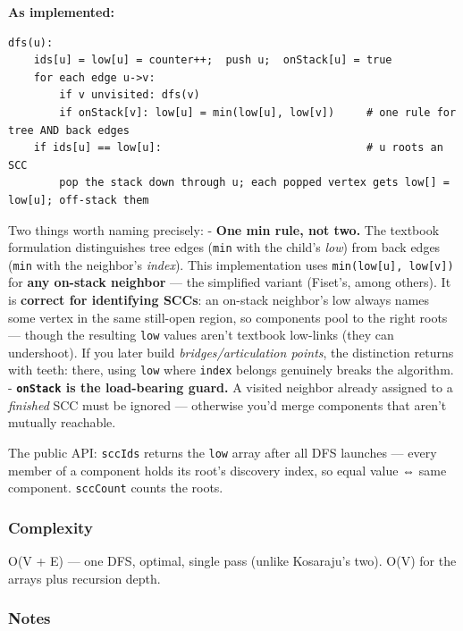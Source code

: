 \documentclass[
  10pt,
  letterpaper,
  onecolumn]{article}
\begin{document}
\textbf{As implemented:}

\begin{verbatim}
dfs(u):
    ids[u] = low[u] = counter++;  push u;  onStack[u] = true
    for each edge u->v:
        if v unvisited: dfs(v)
        if onStack[v]: low[u] = min(low[u], low[v])     # one rule for tree AND back edges
    if ids[u] == low[u]:                                # u roots an SCC
        pop the stack down through u; each popped vertex gets low[] = low[u]; off-stack them
\end{verbatim}

Two things worth naming precisely: - \textbf{One min rule, not two.} The
textbook formulation distinguishes tree edges (\texttt{min} with the
child's \emph{low}) from back edges (\texttt{min} with the neighbor's
\emph{index}). This implementation uses
\texttt{min(low{[}u{]},\ low{[}v{]})} for \textbf{any on-stack neighbor}
--- the simplified variant (Fiset's, among others). It is
\textbf{correct for identifying SCCs}: an on-stack neighbor's low always
names some vertex in the same still-open region, so components pool to
the right roots --- though the resulting \texttt{low} values aren't
textbook low-links (they can undershoot). If you later build
\emph{bridges/articulation points}, the distinction returns with teeth:
there, using \texttt{low} where \texttt{index} belongs genuinely breaks
the algorithm. - \textbf{\texttt{onStack} is the load-bearing guard.} A
visited neighbor already assigned to a \emph{finished} SCC must be
ignored --- otherwise you'd merge components that aren't mutually
reachable.

The public API: \texttt{sccIds} returns the \texttt{low} array after all
DFS launches --- every member of a component holds its root's discovery
index, so equal value ⇔ same component. \texttt{sccCount} counts the
roots.

\hypertarget{complexity-20}{%
\subsubsection{Complexity}\label{complexity-20}}

O(V + E) --- one DFS, optimal, single pass (unlike Kosaraju's two). O(V)
for the arrays plus recursion depth.

\hypertarget{notes-19}{%
\subsubsection{Notes}\label{notes-19}}
\end{document}

